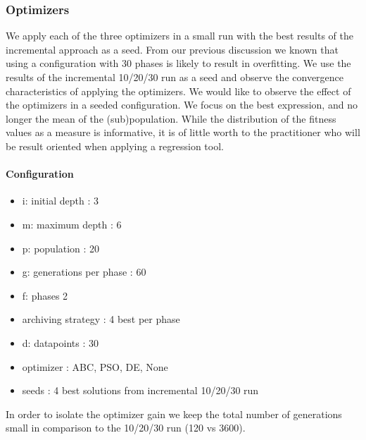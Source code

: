 \subsubsection{Optimizers}
We apply each of the three optimizers in a small run with the best results of the incremental approach as a seed. From our previous discussion we known that using a configuration with 30 phases is likely to result in overfitting. We use the results of the incremental 10/20/30 run as a seed and observe the convergence characteristics of applying the optimizers.
We would like to observe the effect of the optimizers in a seeded configuration. We focus on the best expression, and no longer the mean of the (sub)population. While the distribution of the fitness values as a measure is informative, it is of little worth to the practitioner who will be result oriented when applying a regression tool.
\paragraph{Configuration}
\begin{itemize}
\item i: initial depth : 3
\item m: maximum depth : 6
\item p: population : 20
\item g: generations per phase : 60
\item f: phases 2
\item archiving strategy : 4 best per phase
\item d: datapoints : 30
\item optimizer : ABC, PSO, DE, None
\item seeds : 4 best solutions from incremental 10/20/30 run
\end{itemize}
In order to isolate the optimizer gain we keep the total number of generations small in comparison to the 10/20/30 run (120 vs 3600).
